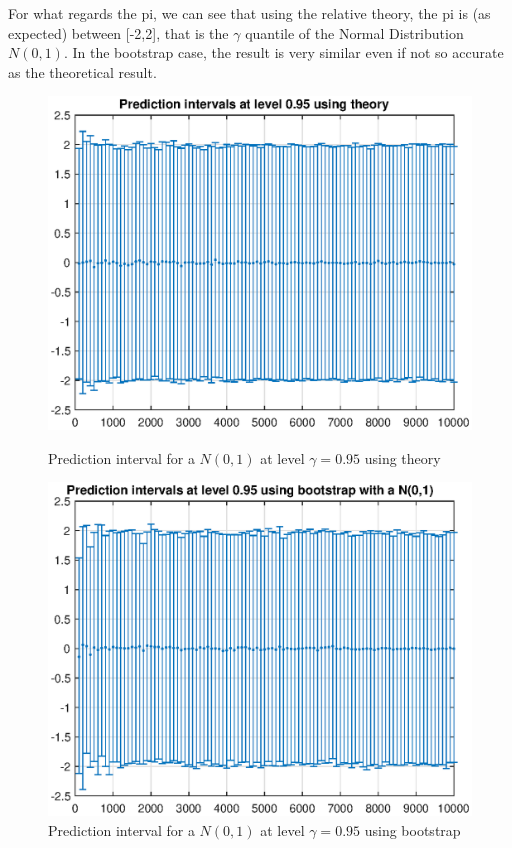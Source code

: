 \documentclass[11pt,a4paper]{article}
\begin{document}
For what regards the \gls{pi}, we can see that using the relative theory, the \gls{pi} is (as expected) between [-2,2], that is the $\gamma$ quantile of the Normal Distribution $N(0,1)$. In the bootstrap case, the result is very similar even if not so accurate as the theoretical result.

\begin{figure}[t]
	\centering
	\begin{minipage}{0.45\textwidth}
		\centering
		\includegraphics[width=\textwidth]{PI_theory_N}
		\caption{Prediction interval for a $N(0,1)$ at level $\gamma = 0.95$ using theory}
		\label{fig:PI_theory_N}
	\end{minipage}
	\begin{minipage}{0.45\textwidth}
		\centering
		\includegraphics[width=\textwidth]{PI_bootstrap_N}
		\caption{Prediction interval for a $N(0,1)$ at level $\gamma = 0.95$ using bootstrap}
		\label{fig:PI_bootstrap_N}
	\end{minipage}
\end{figure}
\end{document}
